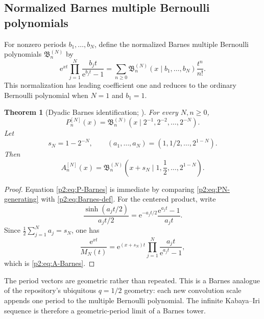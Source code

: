 \documentclass[11pt,oneside]{article}
\numberwithin{equation}{section}
\newtheorem{theorem}{Theorem}[section]
\theoremstyle{definition}
\theoremstyle{remark}
\newcommand{\e}{\mathrm e}
\begin{document}
\subsection{Normalized Barnes multiple Bernoulli polynomials}

For nonzero periods $b_1,\ldots,b_N$, define the normalized Barnes multiple Bernoulli polynomials
$\mathfrak B_n^{(N)}$ by
\begin{equation}
 \e^{xt}\prod_{j=1}^{N}\frac{b_jt}{\e^{b_jt}-1}
 =\sum_{n\ge0}
 \mathfrak B_n^{(N)}(x\mid b_1,\ldots,b_N)\frac{t^n}{n!}.
 \label{p2:eq:Barnes-def}
\end{equation}
This normalization has leading coefficient one and reduces to the ordinary Bernoulli polynomial
when $N=1$ and $b_1=1$.

\begin{theorem}[Dyadic Barnes identification; \statusnew]
\label{p2:thm:Barnes-identification}
For every $N,n\ge0$,
\begin{equation}
 \boxed{
 P_n^{[N]}(x)
 =\mathfrak B_n^{(N)}
 \left(x\mid 2^{-1},2^{-2},\ldots,2^{-N}\right).
 }
 \label{p2:eq:P-Barnes}
\end{equation}
Let
\begin{equation}
 s_N=1-2^{-N},
 \qquad
 (a_1,\ldots,a_N)=(1,1/2,\ldots,2^{1-N}).
 \label{p2:eq:a-sN}
\end{equation}
Then
\begin{equation}
 \boxed{
 A_n^{[N]}(x)
 =\mathfrak B_n^{(N)}
 \left(x+s_N\mid1,\frac12,\ldots,2^{1-N}\right).
 }
 \label{p2:eq:A-Barnes}
\end{equation}
\end{theorem}

\begin{proof}
Equation \eqref{p2:eq:P-Barnes} is immediate by comparing
\eqref{p2:eq:PN-generating} with \eqref{p2:eq:Barnes-def}.  For the centered product, write
\[
 \frac{\sinh(a_jt/2)}{a_jt/2}
 =\e^{-a_jt/2}\frac{\e^{a_jt}-1}{a_jt}.
\]
Since $\frac12\sum_{j=1}^{N}a_j=s_N$, one has
\[
 \frac{\e^{xt}}{M_N(t)}
 =\e^{(x+s_N)t}\prod_{j=1}^{N}\frac{a_jt}{\e^{a_jt}-1},
\]
which is \eqref{p2:eq:A-Barnes}.
\end{proof}

\begin{remark}
The period vectors are geometric rather than repeated.  This is a Barnes analogue of the
repository's ubiquitous $q=1/2$ geometry: each new convolution scale appends one period to the
multiple Bernoulli polynomial.  The infinite Kabaya--Iri sequence is therefore a geometric-period
limit of a Barnes tower.
\end{remark}
\end{document}
